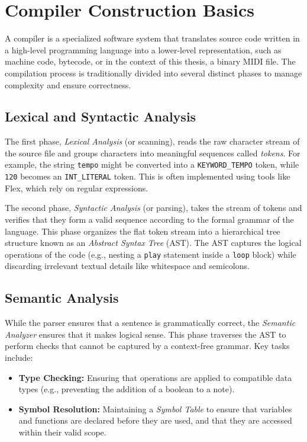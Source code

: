 \section{Compiler Construction Basics}\label{sec:background-compilers}

A compiler is a specialized software system that translates source code written in a high-level programming
language into a lower-level representation, such as machine code, bytecode, or in the context of this thesis,
a binary MIDI file.
The compilation process is traditionally divided into several distinct phases to manage complexity and ensure
correctness.

\subsection{Lexical and Syntactic Analysis}

The first phase, \textit{Lexical Analysis} (or scanning), reads the raw character stream of the source file
and groups characters into meaningful sequences called \textit{tokens}.
For example, the string \texttt{tempo} might be converted into a \texttt{KEYWORD\_TEMPO} token, while
\texttt{120} becomes an \texttt{INT\_LITERAL} token.
This is often implemented using tools like Flex, which rely on regular expressions.

The second phase, \textit{Syntactic Analysis} (or parsing), takes the stream of tokens and verifies that they
form a valid sequence according to the formal grammar of the language.
This phase organizes the flat token stream into a hierarchical tree structure known as an \textit{Abstract
Syntax Tree} (AST).
The AST captures the logical operations of the code (e.g., nesting a \texttt{play} statement inside a
\texttt{loop} block) while discarding irrelevant textual details like whitespace and semicolons.

\subsection{Semantic Analysis}

While the parser ensures that a sentence is grammatically correct, the \textit{Semantic Analyzer} ensures
that it makes logical sense.
This phase traverses the AST to perform checks that cannot be captured by a context-free grammar.
Key tasks include:
\begin{itemize}
  \item \textbf{Type Checking:} Ensuring that operations are applied to compatible data types (e.g.,
    preventing the addition of a boolean to a note).
  \item \textbf{Symbol Resolution:} Maintaining a \textit{Symbol Table} to ensure that variables and
    functions are declared before they are used, and that they are accessed within their valid scope.
\end{itemize}

